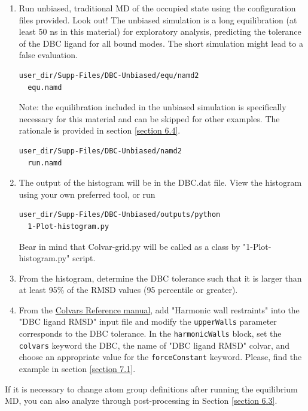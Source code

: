 \documentclass[9pt,tutorial]{livecoms}
\newcommand{\jh}[1]{\textcolor{blue}{JH: #1}}
\newcommand{\Mina}[1]{\textcolor{magenta}{Mina: #1}}
\begin{document}
\begin{enumerate}[left=0pt .. \parindent]
\begin{enumerate}
\item Run unbiased, traditional MD of the occupied state using the configuration files provided. Look out! The unbiased simulation is a long equilibration (at least 50 ns in this material) for exploratory analysis, predicting the tolerance of the DBC ligand for all bound modes. The short simulation might lead to a false evaluation.
\begin{verbatim}
user_dir/Supp-Files/DBC-Unbiased/equ/namd2
  equ.namd
\end{verbatim}
Note: the equilibration included in the unbiased simulation is specifically necessary for this material and can be skipped for other examples. The rationale is provided in section \ref{section 6.4}.
\begin{verbatim}
user_dir/Supp-Files/DBC-Unbiased/namd2
  run.namd
\end{verbatim}
\item The output of the histogram will be in the DBC.dat file. View the histogram using your own preferred tool, or run 
\begin{verbatim}
user_dir/Supp-Files/DBC-Unbiased/outputs/python
  1-Plot-histogram.py
\end{verbatim}
Bear in mind that Colvar-grid.py will be called as a class by "1-Plot-histogram.py" script.
\item From the histogram, determine the DBC tolerance such that it is larger than at least 95\% of the RMSD values (95 percentile or greater).  
\item From the \href{https://colvars.github.io/colvars-refman-namd/colvars-refman-namd.html}{Colvars Reference manual}, add "Harmonic wall restraints" into the "DBC ligand RMSD" input file and modify the \texttt{upperWalls} parameter corresponds to the DBC tolerance. In the \texttt{harmonicWalls} block, set the \texttt{colvars} keyword the DBC, the name of "DBC ligand RMSD" colvar, and choose an appropriate value for the \texttt{forceConstant} keyword. Please, find the example in section \ref{section 7.1}. %
\end{enumerate}
If it is necessary to change atom group definitions after running the equilibrium MD, you can also analyze through post-processing in Section \ref{section 6.3}. 
    

\end{enumerate}
\end{document}
